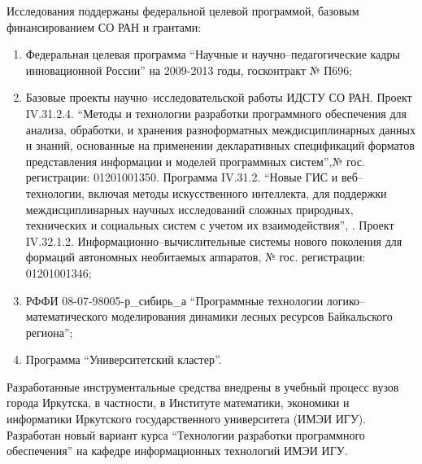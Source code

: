 \documentclass[a4paper]{report}
\begin{document}
Исследования поддержаны федеральной целевой программой, базовым финансированием СО РАН и грантами:
\begin{enumerate}
\item Федеральная целевая программа ``Научные и научно--педагогические кадры инновационной России'' на 2009-2013 годы, госконтракт № П696;
\item Базовые проекты научно--исследовательской работы ИДСТУ СО РАН. Проект IV.31.2.4. ``Методы и технологии разработки программного обеспечения для анализа, обработки, и хранения разноформатных междисциплинарных данных и знаний, основанные на применении декларативных спецификаций форматов представления информации и моделей программных систем'',№ гос. регистрации: 01201001350. Программа IV.31.2. ``Новые ГИС и веб--технологии, включая методы искусственного интеллекта, для поддержки междисциплинарных научных исследований сложных природных, технических и социальных систем с учетом их взаимодействия'', . Проект IV.32.1.2. Информационно--вычислительные системы нового поколения для формаций автономных необитаемых аппаратов, № гос. регистрации: 01201001346;
\item РФФИ 08-07-98005-р\_сибирь\_а ``Программные технологии логико--математического моделирования динамики лесных ресурсов Байкальского региона'';
\item Программа ``Университетский кластер''.
\end{enumerate}

Разработанные инструментальные средства внедрены в учебный процесс вузов города Иркутска, в частности, в Институте математики, экономики и информатики Иркутского государственного университета (ИМЭИ ИГУ). Разработан новый вариант курса ``Технологии разработки программного обеспечения'' на кафедре информационных технологий ИМЭИ ИГУ.
\end{document}
